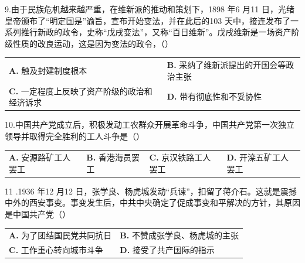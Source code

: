 \documentclass[UTF8,11pt]{ctexart}
\begin{document}
9.由于民族危机越来越严重，在维新派的推动和策划下，1898 年6 月11 日，光绪皇帝颁布了“明定国是”谕旨，宣布开始变法，并在此后的103 天中，接连发布了一系列推行新政的政令，史称“戊戌变法”，又称“百日维新”。戊戌维新是一场资产阶级性质的改良运动，这是因为变法的政令，（）


\begin{center}\begin{tabular}{>{\raggedright\arraybackslash}p{\dimexpr(\linewidth-4\tabcolsep)/2\relax}>{\raggedright\arraybackslash}p{\dimexpr(\linewidth-4\tabcolsep)/2\relax}}
\textbf{A.} 触及封建制度根本 & \textbf{B.} 采纳了维新派提出的开国会等政治主张\\[.35em]
\textbf{C.} 一定程度上反映了资产阶级的政治和经济诉求 & \textbf{D.} 带有彻底性和不妥协性\\[.35em]\end{tabular}\end{center}

10.中国共产党成立后，积极发动工农群众开展革命斗争，中国共产党第一次独立领导并取得完全胜利的工人斗争是（）


\begin{center}\begin{tabular}{>{\raggedright\arraybackslash}p{\dimexpr(\linewidth-8\tabcolsep)/4\relax}>{\raggedright\arraybackslash}p{\dimexpr(\linewidth-8\tabcolsep)/4\relax}>{\raggedright\arraybackslash}p{\dimexpr(\linewidth-8\tabcolsep)/4\relax}>{\raggedright\arraybackslash}p{\dimexpr(\linewidth-8\tabcolsep)/4\relax}}
\textbf{A.} 安源路矿工人罢工 & \textbf{B.} 香港海员罢工 & \textbf{C.} 京汉铁路工人罢工 & \textbf{D.} 开滦五矿工人罢工\\[.35em]\end{tabular}\end{center}

11 .1936 年12 月12 日，张学良、杨虎城发动“兵谏”，扣留了蒋介石。这就是震撼中外的西安事变。事变发生后，中共中央确定了促成事变和平解决的方针，其原因是中国共产党（）


\begin{center}\begin{tabular}{>{\raggedright\arraybackslash}p{\dimexpr(\linewidth-4\tabcolsep)/2\relax}>{\raggedright\arraybackslash}p{\dimexpr(\linewidth-4\tabcolsep)/2\relax}}
\textbf{A.} 为了团结国民党共同抗日 & \textbf{B.} 不赞成张学良、杨虎城的主张\\[.35em]
\textbf{C.} 工作重心转向城市斗争 & \textbf{D.} 接受了共产国际的指示\\[.35em]\end{tabular}\end{center}
\end{document}
